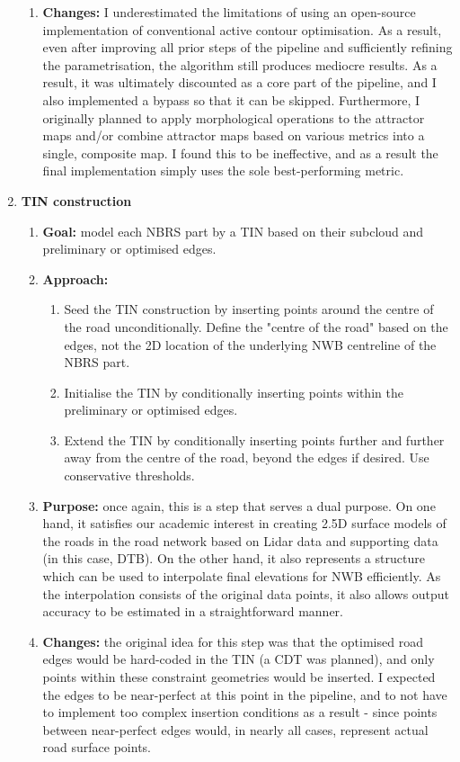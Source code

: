 \begin{enumerate}
\begin{enumerate}
        \item \textbf{Changes:} I underestimated the limitations of using an open-source implementation of conventional active contour optimisation. As a result, even after improving all prior steps of the pipeline and sufficiently refining the parametrisation, the algorithm still produces mediocre results. As a result, it was ultimately discounted as a core part of the pipeline, and I also implemented a bypass so that it can be skipped. Furthermore, I originally planned to apply morphological operations to the attractor maps and/or combine attractor maps based on various metrics into a single, composite map. I found this to be ineffective, and as a result the final implementation simply uses the sole best-performing metric.
    \end{enumerate}
    \item \textbf{TIN construction}
    \begin{enumerate}
        \item \textbf{Goal:} model each NBRS part by a TIN based on their subcloud and preliminary or optimised edges.
        \item \textbf{Approach:}
        \begin{enumerate}
            \item Seed the TIN construction by inserting points around the centre of the road unconditionally. Define the "centre of the road" based on the edges, not the 2D location of the underlying NWB centreline of the NBRS part.
            \item Initialise the TIN by conditionally inserting points within the preliminary or optimised edges.
            \item Extend the TIN by conditionally inserting points further and further away from the centre of the road, beyond the edges if desired. Use conservative thresholds. 
        \end{enumerate}
        \item \textbf{Purpose:} once again, this is a step that serves a dual purpose. On one hand, it satisfies our academic interest in creating 2.5D surface models of the roads in the road network based on Lidar data and supporting data (in this case, DTB). On the other hand, it also represents a structure which can be used to interpolate final elevations for NWB efficiently. As the interpolation consists of the original data points, it also allows output accuracy to be estimated in a straightforward manner.
        \item \textbf{Changes:} the original idea for this step was that the optimised road edges would be hard-coded in the TIN (a CDT was planned), and only points within these constraint geometries would be inserted. I expected the edges to be near-perfect at this point in the pipeline, and to not have to implement too complex insertion conditions as a result - since points between near-perfect edges would, in nearly all cases, represent actual road surface points.

\end{enumerate}
\end{enumerate}
